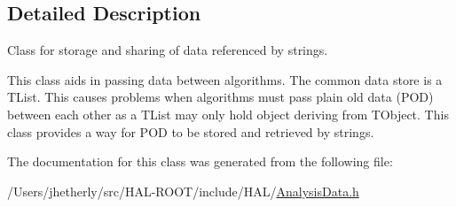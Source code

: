 \subsection{Detailed Description}
Class for storage and sharing of data referenced by strings. 

This class aids in passing data between algorithms. The common data store is a T\+List. This causes problems when algorithms must pass plain old data (P\+O\+D) between each other as a T\+List may only hold object deriving from T\+Object. This class provides a way for P\+O\+D to be stored and retrieved by strings. 

The documentation for this class was generated from the following file\+:\begin{DoxyCompactItemize}
\item 
/\+Users/jhetherly/src/\+H\+A\+L-\/\+R\+O\+O\+T/include/\+H\+A\+L/\hyperlink{_analysis_data_8h}{Analysis\+Data.\+h}\end{DoxyCompactItemize}
